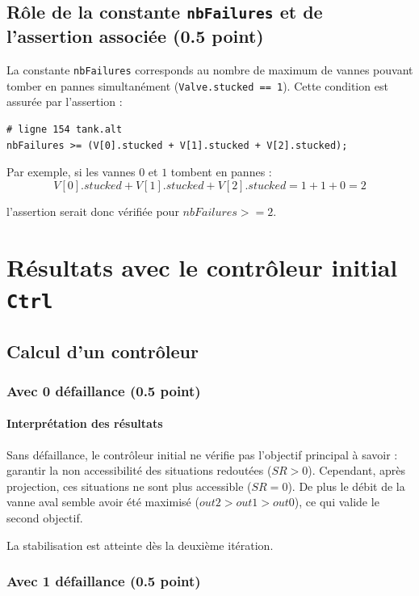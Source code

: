 \documentclass[a4paper]{book}
\begin{document}
\subsection{Rôle de la constante {\tt nbFailures} et de l'assertion associée (0.5 point)}

La constante \texttt{nbFailures} corresponds au nombre de maximum de vannes
pouvant tomber en pannes simultanément (\texttt{Valve.stucked == 1}). Cette
condition est assurée par l'assertion :
\begin{verbatim}
# ligne 154 tank.alt
nbFailures >= (V[0].stucked + V[1].stucked + V[2].stucked);
\end{verbatim}

Par exemple, si les vannes $0$ et $1$ tombent en pannes :
$$
V[0].stucked + V[1].stucked + V[2].stucked = 1 + 1 + 0 = 2
$$

l'assertion serait donc vérifiée pour $nbFailures >= 2$.

\section{Résultats avec le contrôleur initial {\tt Ctrl}}
\subsection{Calcul d'un contrôleur}
\subsubsection{Avec 0 défaillance (0.5 point)}

\paragraph{Interprétation des résultats}

Sans défaillance, le contrôleur initial ne vérifie pas l'objectif principal à
savoir : garantir la non accessibilité des situations redoutées ($SR > 0$).
Cependant, après projection, ces situations ne sont plus accessible ($SR = 0$).
De plus le débit de la vanne aval semble avoir été maximisé ($out2 > out1 >
out0$), ce qui valide le second objectif.

La stabilisation est atteinte dès la deuxième itération.

\subsubsection{Avec 1 défaillance (0.5 point)}

\end{document}
